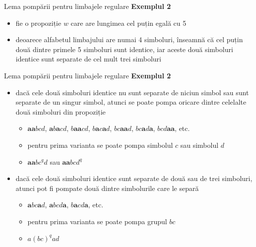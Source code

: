 \documentclass[pdf]{beamer}
\begin{document}
\begin{frame}{Lema pompării pentru limbajele regulare}
\textbf{Exemplul 2}
\begin{itemize}
\item
fie o propoziție $w$ care are lungimea cel puțin egală cu 5
\item
deoarece alfabetul limbajului are numai 4 simboluri, înseamnă că cel puțin două dintre primele 5 simboluri sunt identice, iar aceste două simboluri identice sunt separate de cel mult trei simboluri
\end{itemize}
\end{frame}



\begin{frame}{Lema pompării pentru limbajele regulare}
\textbf{Exemplul 2}
\begin{itemize}
\item
dacă cele două simboluri identice nu sunt separate de niciun simbol sau sunt separate de un singur simbol, atunci se poate pompa oricare dintre celelalte două simboluri din propoziție

\begin{itemize}
\item
$\textbf{aa}bcd$, $\textbf{a}b\textbf{a}cd$, $b\textbf{aa}cd$, $b\textbf{a}c\textbf{a}d$, $bc\textbf{aa}d$, $bc\textbf{a}d\textbf{a}$, $bcd\textbf{aa}$, etc.
\item
pentru prima varianta se poate pompa simbolul $c$ sau simbolul $d$
\item
$\textbf{aa}bc^q d$ sau $\textbf{aa}bcd^q$
\end{itemize}
\item
dacă cele două simboluri identice sunt separate de două sau de trei simboluri, atunci pot fi pompate două dintre simbolurile care le separă
\begin{itemize}
\item
$\textbf{a}bc\textbf{a}d$, $\textbf{a}bcd\textbf{a}$, $b\textbf{a}cd\textbf{a}$, etc.
\item
pentru prima varianta se poate pompa grupul $bc$
\item
$a(bc)^q ad$
\end{itemize}
\end{itemize}
\end{frame}
\end{document}
